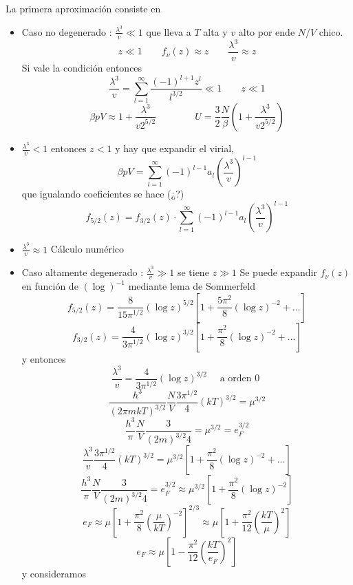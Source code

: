 \documentclass[10pt,oneside]{CBFT_book}
\begin{document}
La primera aproximación consiste en 
\begin{itemize}
 \item Caso no degenerado : $\frac{\lambda^3}{v} \ll 1 $  que lleva a $ T $ alta y $ v $ alto
 por ende $ N/V $ chico.
 \[	
	z \ll 1 \qquad f_\nu(z) \approx z \qquad \frac{\lambda^3}{v} \approx z
 \]
 Si vale la condición entonces 
 \[
	\frac{\lambda^3}{v} = \sum_{l=1}^\infty \frac{(-1)^{l+1} z^l }{l^{3/2}} \ll 1 \qquad z \ll 1
 \]
 \[
	\beta p V \approx 1 + \frac{\lambda^3}{v 2^{5/2}} \qquad \qquad U = \frac{3}{2} \frac{N}{\beta}
	\left( 1 + \frac{\lambda^3}{v 2^{5/2}} \right)
 \]
 \item $\frac{\lambda^3}{v} < 1 $ entonces $ z < 1 $ y hay que expandir el virial,
 \[
	\beta p V = \sum_{l=1}^\infty (-1)^{l-1} a_l \left(\frac{\lambda^3}{v} \right)^{l-1}
 \]
 que igualando coeficientes se hace (¿?)
 \[
	f_{5/2}(z) = f_{3/2}(z) \cdot \sum_{l=1}^\infty (-1)^{l-1} a_l \left(\frac{\lambda^3}{v} \right)^{l-1}
 \]
 \item $\frac{\lambda^3}{v} \approx 1 $ Cálculo numérico
 \item Caso altamente degenerado : $\frac{\lambda^3}{v} \gg 1 $ se tiene $ z \gg 1 $ 
 Se puede expandir $ f_\nu(z) $ en función de $ (\log )^{-1} $ mediante lema de Sommerfeld
 \[
	f_{5/2}(z) = \frac{8}{15\pi^{1/2}} (\log z)^{5/2} \left[ 1 + \frac{5\pi^2}{8}(\log z)^{-2} + ... \right]
 \]
 \[
	f_{3/2}(z) = \frac{4}{3\pi^{1/2}} (\log z)^{3/2} \left[ 1 + \frac{\pi^2}{8}(\log z)^{-2} + ... \right]
 \]
 y entonces
 \[
	\frac{\lambda^3}{v} = \frac{4}{3\pi^{1/2}} (\log z)^{3/2}  \quad \text{ a orden 0 }
 \]
 \[
	\frac{h^3}{ (2\pi mkT)^{3/2} } \frac{N}{V} \frac{3\pi^{1/2}}{4} (kT)^{3/2} = \mu^{ 3/2 }
 \]
 \[
	\frac{ h^3 }{ \pi } \frac{ N }{ V } \frac{ 3 }{ ( 2m )^{ 3/2 } 4 } = \mu^{ 3/2 } = e_F^{3/2}
 \]
 \[
	\frac{\lambda^3}{v}\frac{3\pi^{1/2}}{4} (kT)^{3/2} = 
	\mu^{3/2}\left[ 1 + \frac{\pi^2}{8}(\log z)^{-2} + ... \right]
 \]
 \[
	\frac{ h^3 }{ \pi } \frac{ N }{ V } \frac{ 3 }{ ( 2m )^{ 3/2 } 4 } = e_F^{3/2} \approx
	\mu^{3/2} \left[ 1 + \frac{\pi^2}{8}(\log z)^{-2} \right]
 \]
 \[
	e_F \approx \mu \left[ 1 + \frac{\pi^2}{8}( \frac{ \mu }{ kT } )^{-2} \right]^{ 2/3 } \approx 
	\mu \left[ 1 + \frac{\pi^2}{12}( \frac{ kT }{ \mu } )^{2} \right]
 \]
 \[
	e_F \approx \mu \left[ 1 - \frac{\pi^2}{12}( \frac{ kT }{ e_F } )^{2} \right]
 \]
 y consideramos

\end{itemize}
\end{document}
